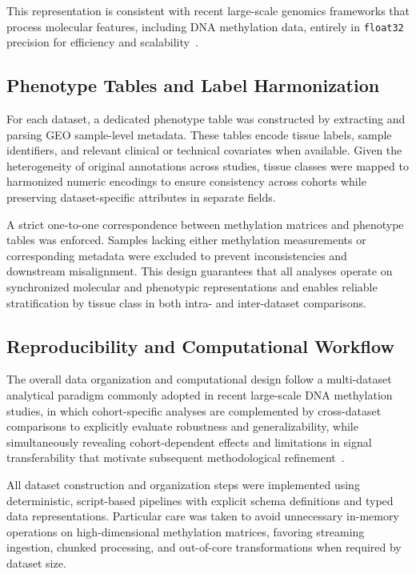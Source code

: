 This representation is consistent with recent large-scale genomics frameworks that process molecular features, including DNA methylation data, entirely in \texttt{float32} precision for efficiency and scalability~\cite{deAlmeida2025ChatNT}.

\subsection{Phenotype Tables and Label Harmonization}

For each dataset, a dedicated phenotype table was constructed by extracting and parsing GEO sample-level metadata. These tables encode tissue labels, sample identifiers, and relevant clinical or technical covariates when available. Given the heterogeneity of original annotations across studies, tissue classes were mapped to harmonized numeric encodings to ensure consistency across cohorts while preserving dataset-specific attributes in separate fields.

A strict one-to-one correspondence between methylation matrices and phenotype tables was enforced. Samples lacking either methylation measurements or corresponding metadata were excluded to prevent inconsistencies and downstream misalignment. This design guarantees that all analyses operate on synchronized molecular and phenotypic representations and enables reliable stratification by tissue class in both intra- and inter-dataset comparisons.

\subsection{Reproducibility and Computational Workflow}

The overall data organization and computational design follow a multi-dataset analytical paradigm commonly adopted in recent large-scale DNA methylation studies, in which cohort-specific analyses are complemented by cross-dataset comparisons to explicitly evaluate robustness and generalizability, while simultaneously revealing cohort-dependent effects and limitations in signal transferability that motivate subsequent methodological refinement~\cite{Sokolov2024}.

All dataset construction and organization steps were implemented using deterministic, script-based pipelines with explicit schema definitions and typed data representations. Particular care was taken to avoid unnecessary in-memory operations on high-dimensional methylation matrices, favoring streaming ingestion, chunked processing, and out-of-core transformations when required by dataset size.

